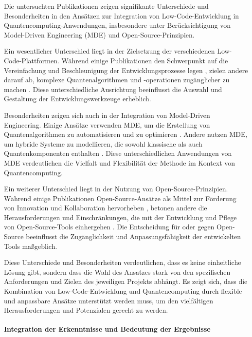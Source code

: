Die untersuchten Publikationen zeigen signifikante Unterschiede und Besonderheiten in den Ansätzen 
zur Integration von Low-Code-Entwicklung in Quantencomputing-Anwendungen, insbesondere unter Berücksichtigung 
von Model-Driven Engineering (MDE) und Open-Source-Prinzipien.

Ein wesentlicher Unterschied liegt in der Zielsetzung der verschiedenen Low-Code-Plattformen. 
Während einige Publikationen den Schwerpunkt auf die Vereinfachung und Beschleunigung der 
Entwicklungsprozesse legen \cite{Sahay_2020, Khorram_2020}, zielen andere darauf ab, komplexe 
Quantenalgorithmen und -operationen zugänglicher zu machen \cite{Gemeinhardt_2021, Gemeinhardt_2023}. 
Diese unterschiedliche Ausrichtung beeinflusst die Auswahl und Gestaltung der Entwicklungswerkzeuge erheblich.

Besonderheiten zeigen sich auch in der Integration von Model-Driven Engineering. Einige Ansätze 
verwenden MDE, um die Erstellung von Quantenalgorithmen zu automatisieren und zu optimieren \cite{Moin_2021, Pérez-Castillo_2022}. 
Andere nutzen MDE, um hybride Systeme zu modellieren, die sowohl klassische als auch Quantenkomponenten 
enthalten \cite{Weder_2020, Polat_2024}. Diese unterschiedlichen Anwendungen von MDE verdeutlichen die Vielfalt 
und Flexibilität der Methode im Kontext von Quantencomputing.

Ein weiterer Unterschied liegt in der Nutzung von Open-Source-Prinzipien. Während einige Publikationen Open-Source-Ansätze 
als Mittel zur Förderung von Innovation und Kollaboration hervorheben \cite{Amato_2023, Ahmad_2023}, betonen andere die 
Herausforderungen und Einschränkungen, die mit der Entwicklung und Pflege von Open-Source-Tools einhergehen \cite{Sánchez_2021}. 
Die Entscheidung für oder gegen Open-Source beeinflusst die Zugänglichkeit und Anpassungsfähigkeit der entwickelten Tools maßgeblich.

Diese Unterschiede und Besonderheiten verdeutlichen, dass es keine einheitliche Lösung gibt, sondern dass die Wahl 
des Ansatzes stark von den spezifischen Anforderungen und Zielen des jeweiligen Projekts abhängt. Es zeigt sich, dass 
die Kombination von Low-Code-Entwicklung und Quantencomputing durch flexible und anpassbare Ansätze unterstützt werden 
muss, um den vielfältigen Herausforderungen und Potenzialen gerecht zu werden.

\paragraph{Integration der Erkenntnisse und Bedeutung der Ergebnisse}

